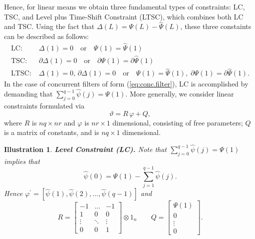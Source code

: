 \documentclass[a4paper]{book}
\newtheorem{Illustration}{Illustration}
\begin{document}
     Hence, for linear means we obtain
 three fundamental types of constraints: LC, TSC, and Level plus 
 Time-Shift Constraint (LTSC), which combines both LC and TSC.
  Using the fact that $\Delta (L) = \Psi (L) - \widehat{\Psi} (L)$,
   these three constaints can be described as follows:
\begin{align*}
 \mbox{LC} : &  \;  \Delta (1) = 0 \quad \mbox{or} \quad \Psi (1) = \widehat{\Psi} (1) \\
 \mbox{TSC} : &  \;   \partial {\Delta} (1) = 0 \quad \mbox{or} \quad 
 \partial {\Psi} (1) = \partial {\widehat{\Psi}} (1)  \\
 \mbox{LTSC} : &  \;  \Delta (1) = 0,  \,  \partial {\Delta} (1) = 0 \quad 
 \mbox{or} \quad \Psi (1) = \widehat{\Psi} (1), \; \partial {\Psi} (1) =
 \partial {\widehat{\Psi}} (1).
\end{align*}
 In the case of  concurrent filters of form  (\ref{eq:conc.filter}), 
 LC is accomplished by demanding that 
  $\sum_{j=0}^{q-1} \widehat{\psi} (j) = \Psi(1)$.   More generally, we consider  linear constraints  formulated via
\begin{equation}
\label{eq:concurrent-constrain}
  \vartheta = R \, \varphi + Q,
\end{equation}
 where $R$ is $n q \times n r$ and $\varphi$ is $n r \times 1$ dimensional, consisting of 
 free parameters; $Q$ is a matrix of constants, and is $n q \times 1$ dimensional.


\begin{Illustration}  {\bf Level Constraint (LC).}   \rm
\label{ill:lc}
 Note that $\sum_{j=0}^{q-1} \widehat{\psi} (j) = \Psi(1)$ implies that
\begin{equation}
\label{eq:lc-gamma0}
 \widehat{\psi} (0) = \Psi(1) - \sum_{j=1}^{q-1} \widehat{\psi} (j).
\end{equation}
 Hence  $ \varphi^{\prime}  = [ \widehat{\psi} (1), \widehat{\psi} (2), \ldots, \widehat{\psi} (q-1) ] $ and
\[
	R  = \left[ \begin{array}{ccc} -1 & \ldots & -1 \\ 1 & 0 & 0 \\
		\vdots & \ddots & \vdots \\ 0 & 0 & 1  \end{array} \right]  \otimes 1_n \qquad
	Q = \left[ \begin{array}{c} \Psi (1) \\ 0 \\ \vdots \\ 0 \end{array} \right].
\]
\end{Illustration}
 
\end{document}

